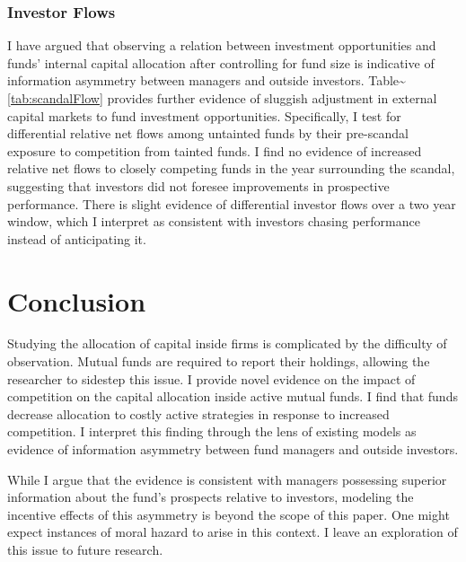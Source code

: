 \documentclass[openany]{book}
\theoremstyle{definition}
\theoremstyle{definition}
\theoremstyle{definition}
\theoremstyle{remark}
\begin{document}
\subsection{Investor Flows}

I have argued that observing a relation between investment opportunities
and funds' internal capital allocation after controlling for fund size
is indicative of information asymmetry between managers and outside
investors. Table\textasciitilde{}\ref{tab:scandalFlow} provides further
evidence of sluggish adjustment in external capital markets to fund
investment opportunities. Specifically, I test for differential relative
net flows among untainted funds by their pre-scandal exposure to
competition from tainted funds. I find no evidence of increased relative
net flows to closely competing funds in the year surrounding the
scandal, suggesting that investors did not foresee improvements in
prospective performance. There is slight evidence of differential
investor flows over a two year window, which I interpret as consistent
with investors chasing performance instead of anticipating it.

\hypertarget{sec:conclusion}{%
\chapter{Conclusion}\label{sec:conclusion}}

Studying the allocation of capital inside firms is complicated by the
difficulty of observation. Mutual funds are required to report their
holdings, allowing the researcher to sidestep this issue. I provide
novel evidence on the impact of competition on the capital allocation
inside active mutual funds. I find that funds decrease allocation to
costly active strategies in response to increased competition. I
interpret this finding through the lens of existing models as evidence
of information asymmetry between fund managers and outside investors.

While I argue that the evidence is consistent with managers possessing
superior information about the fund's prospects relative to investors,
modeling the incentive effects of this asymmetry is beyond the scope of
this paper. One might expect instances of moral hazard to arise in this
context. I leave an exploration of this issue to future research.

\hypertarget{refs}{}

\hypertarget{appendix-appendix}{%
\appendix}


\singlespacing
\end{document}
